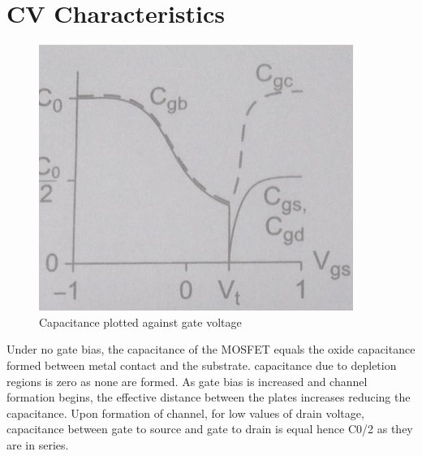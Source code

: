 \section{CV Characteristics}
\begin{figure}[H]
\centering
\includegraphics[scale=0.5]{./fig25} %
\caption{Capacitance plotted against gate voltage}
\label{3.25} %
\end{figure}

Under no gate bias, the capacitance of the MOSFET equals the oxide capacitance formed between metal contact and the substrate. capacitance due to depletion regions is zero as none are formed. As gate bias is increased and channel formation begins, the effective distance between the plates increases reducing the capacitance. Upon formation of channel, for low values of drain voltage, capacitance between gate to source and gate to drain is equal hence C0/2 as they are in series.
